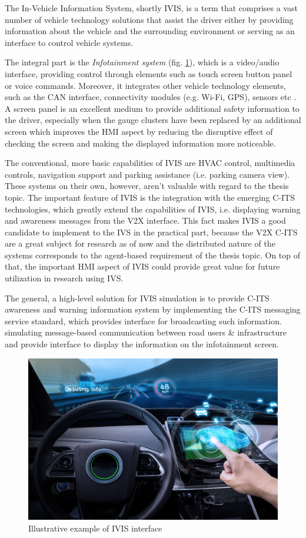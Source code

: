 \documentclass[main.tex]{subfiles}
\begin{document}
The In-Vehicle Information System, shortly IVIS, is a term that comprises a vast number of vehicle technology 
solutions that assist the driver either by providing information about the vehicle and the surrounding environment 
or serving as an interface to control vehicle systems. 

The integral part is the \emph{Infotainment system} (fig. \ref{ivis-interface}), which is a
video/audio interface, providing control through elements such as touch screen button panel or
voice commands.  Moreover, it integrates other vehicle technology elements, such as the CAN
interface, connectivity modules (e.g. Wi-Fi, GPS), sensors etc \cite{Saxena}. A screen panel is
an excellent medium to provide additional safety information to the driver, especially when the
gauge clusters have been replaced by an additional screen which improves the HMI aspect by
reducing the disruptive effect of checking the screen and making the displayed information more
noticeable. 

The conventional, more basic capabilities of IVIS are HVAC control, multimedia controls, navigation support and 
parking assistance (i.e. parking camera view). These systems on their own, however, aren't valuable with regard 
to the thesis topic. The important feature of IVIS is the integration with the emerging C-ITS technologies, which 
greatly extend the capabilities of IVIS, i.e. displaying warning and awareness messages from the V2X interface. 
This fact makes IVIS a good candidate to implement to the IVS in the practical part, because the V2X C-ITS are 
a great subject for research as of now and the distributed nature of the systems corresponds to the agent-based 
requirement of the thesis topic. On top of that, the important HMI aspect of IVIS could provide great value for 
future utilization in research using IVS. 

The general, a high-level solution for IVIS simulation is to provide C-ITS awareness and warning information system by 
implementing the C-ITS messaging service standard, which provides interface for broadcasting such information.
 simulating message-based communication between road users \& infrastructure and provide interface to display the 
information on the infotainment screen.

\begin{figure}[htbp]
    \centering
    \includegraphics[width=.8\textwidth]{ivis-dashboard.jpg}
    \caption{Illustrative example of IVIS interface \cite{Saxena}}
    \label{ivis-interface}
\end{figure}
\end{document}
